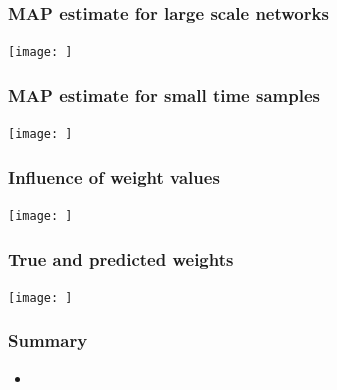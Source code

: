 \documentclass[final]{beamer}
\begin{document}
\begin{frame}
\frametitle{MAP estimate for large scale networks}
\begin{center}
\texttt{[image: ]}
\end{center}
\end{frame}

\begin{frame}
\frametitle{MAP estimate for small time samples}
\begin{center}
\texttt{[image: ]}
\end{center}
\end{frame}

\begin{frame}
\frametitle{Influence of weight values}
\begin{center}
\texttt{[image: ]}
\end{center}
\end{frame}

\begin{frame}
\frametitle{True and predicted weights}
\begin{center}
\texttt{[image: ]}
\end{center}
\end{frame}

\begin{frame}
	\frametitle{Summary}
	\begin{itemize}
		\item 
	\end{itemize}
\end{frame}
\end{document}
